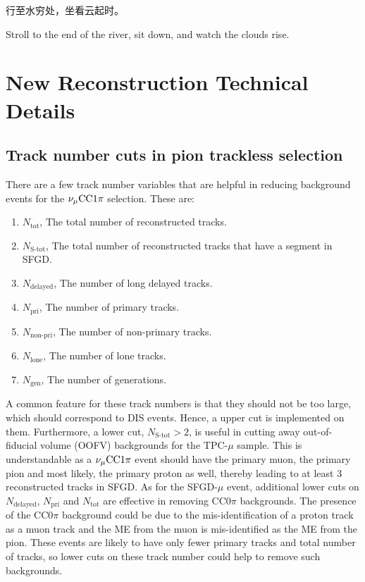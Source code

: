 \begin{savequote}[8cm]
\begin{CJK*}{UTF8}{gbsn}
  行至水穷处，坐看云起时。
\end{CJK*}

Stroll to the end of the river, sit down, and watch the clouds rise.

\end{savequote}

\chapter{\label{app:newtech}New Reconstruction Technical Details}

\minitoc

\section{Track number cuts in pion trackless selection}
\label{sec:app-tlpi-trknumcut}
There are a few track number variables that are helpful in reducing background events for the $\nu_{\mu}\textrm{CC}1\pi$ selection. 
These are:
\begin{enumerate}
    \item $N_{\textrm{tot}}$, The total number of reconstructed tracks.
    \item $N_{\textrm{S-tot}}$, The total number of reconstructed tracks that have a segment in SFGD.
    \item $N_{\textrm{delayed}}$, The number of long delayed tracks.
    \item $N_{\textrm{pri}}$, The number of primary tracks.
    \item $N_{\textrm{non-pri}}$, The number of non-primary tracks.
    \item $N_{\textrm{lone}}$, The number of lone tracks.
    \item $N_{\textrm{gen}}$, The number of generations.
\end{enumerate}
A common feature for these track numbers is that they should not be too large, which should correspond to DIS events.
Hence, a upper cut is implemented on them.
Furthermore, a lower cut, $N_{\textrm{S-tot}}>2$, is useful in cutting away out-of-fiducial volume (OOFV) backgrounds for the TPC-$\mu$ sample.
This is understandable as a $\nu_{\mu}\textrm{CC}1\pi$ event should have the primary muon, the primary pion and most likely, the primary proton as well, thereby leading to at least $3$ reconstructed tracks in SFGD.
As for the SFGD-$\mu$ event, additional lower cuts on  $N_{\textrm{delayed}}$, $N_{\textrm{pri}}$ and $N_{\textrm{tot}}$ are effective in removing CC$0\pi$ backgrounds.
The presence of the CC$0\pi$ background could be due to the mis-identification of a proton track as a muon track and the ME from the muon is mis-identified as the ME from the pion.
These events are likely to have only fewer primary tracks and total number of tracks, so lower cuts on these track number could help to remove such backgrounds.

